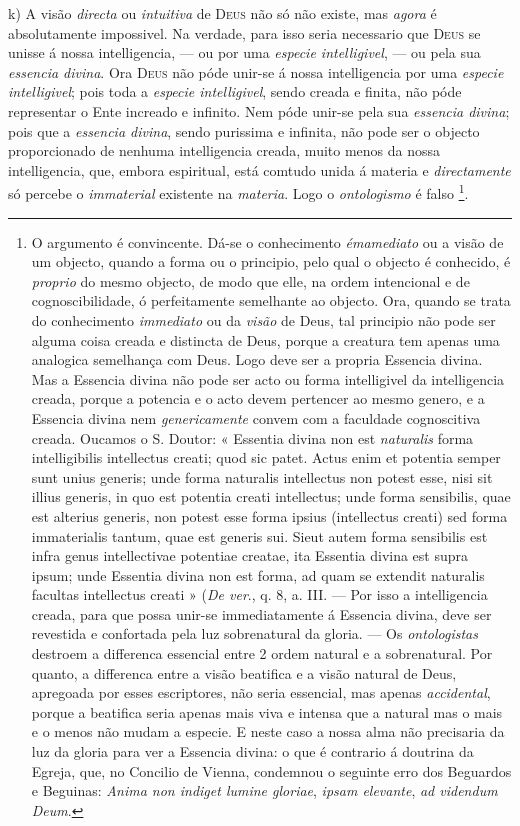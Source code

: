 k) A visão \emph{directa} ou \emph{intuitiva} de \textsc{Deus} não só não existe, mas \emph{agora} é absolutamente impossivel. Na verdade, para isso seria necessario que \textsc{Deus} se unisse á nossa intelligencia, --- ou por uma \emph{especie intelligivel}, --- ou pela sua \emph{essencia divina}. Ora \textsc{Deus} não póde unir-se á nossa intelligencia por uma \emph{especie}   \emph{intelligivel}; pois toda a \emph{especie intelligivel}, sendo creada e finita, não póde representar o Ente increado e infinito. Nem póde unir-se pela sua \emph{essencia divina}; pois que a \emph{essencia divina}, sendo purissima e infinita, não pode ser o objecto proporcionado de nenhuma intelligencia creada, muito menos da nossa intelligencia, que, embora espiritual, está comtudo unida á materia e \emph{directamente} só percebe o \emph{immaterial} existente na \emph{materia}. Logo o \emph{ontologismo} é falso \footnote{O argumento é convincente. Dá-se o conhecimento \emph{émamediato} ou a visão de um objecto, quando a forma ou o principio, pelo qual o objecto é conhecido, é \emph{proprio} do mesmo objecto, de modo que elle, na ordem intencional e de cognoscibilidade, ó perfeitamente semelhante ao objecto. Ora, quando se trata do conhecimento \emph{immediato} ou da \emph{visão} de Deus, tal principio não pode ser alguma coisa creada e distincta de Deus, porque a creatura tem apenas uma analogica semelhança com Deus. Logo deve ser a propria Essencia divina. Mas a Essencia divina não pode ser acto ou forma intelligivel da intelligencia creada, porque a potencia e o acto devem pertencer ao mesmo genero, e a Essencia divina nem \emph{genericamente} convem com a faculdade cognoscitiva creada. Oucamos o S. Doutor: « Essentia divina non est \emph{naturalis} forma intelligibilis intellectus creati; quod sic patet. Actus enim et potentia semper sunt unius generis; unde forma naturalis intellectus non potest esse, nisi sit illius generis, in quo est potentia creati intellectus; unde forma sensibilis, quae est alterius generis, non potest esse forma ipsius (intellectus creati) sed forma immaterialis tantum, quae est generis sui. Sieut autem forma sensibilis est infra genus intellectivae potentiae creatae, ita Essentia divina est supra ipsum; unde Essentia divina non est forma, ad quam se extendit naturalis facultas intellectus creati » (\emph{De ver}., q. 8, a. III. --- Por isso a intelligencia creada, para que possa unir-se immediatamente á Essencia divina, deve ser revestida e confortada pela luz sobrenatural da gloria. --- Os \emph{ontologistas} destroem a differenca essencial entre 2 ordem natural e a sobrenatural. Por quanto, a differenca entre a visão beatifica e a visão natural de Deus, apregoada por esses escriptores, não seria essencial, mas apenas \emph{accidental}, porque a beatifica seria apenas mais viva e intensa que a natural mas o mais e o menos não mudam a especie. E neste caso a nossa alma não precisaria da luz da gloria para ver a Essencia divina: o que é contrario á doutrina da Egreja, que, no Concilio de Vienna, condemnou o seguinte erro dos Beguardos e Beguinas: \emph{Anima non indiget lumine gloriae}, \emph{ipsam elevante}, \emph{ad videndum Deum}.}.

